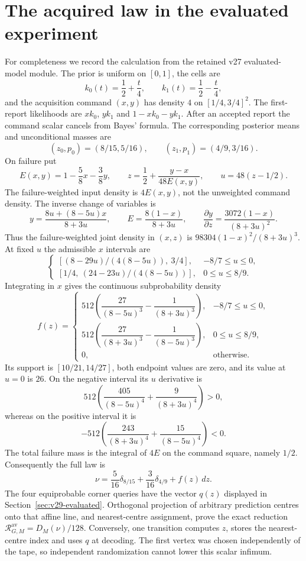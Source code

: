 \documentclass[11pt]{amsart}
\theoremstyle{definition}\newtheorem{definition}[theorem]{Definition}
\theoremstyle{remark}\newtheorem{remark}[theorem]{Remark}
\begin{document}
\section{The acquired law in the evaluated experiment}
\label{app:v29-density}
For completeness we record the calculation from the retained v27 evaluated-model module. The prior is uniform on $[0,1]$, the cells are
\[
 k_0(t)=\frac12+\frac t4,\qquad k_1(t)=\frac12-\frac t4,
\]
and the acquisition command $(x,y)$ has density $4$ on $[1/4,3/4]^2$. The first-report likelihoods are $xk_0$, $yk_1$ and $1-xk_0-yk_1$. After an accepted report the command scalar cancels from Bayes' formula. The corresponding posterior means and unconditional masses are
\[
 (z_0,p_0)=(8/15,5/16),\qquad (z_1,p_1)=(4/9,3/16).
\]
On failure put
\[
 E(x,y)=1-\frac58x-\frac38y,
 \qquad z=\frac12+\frac{y-x}{48E(x,y)},
 \qquad u=48(z-1/2).
\]
The failure-weighted input density is $4E(x,y)$, not the unweighted command density. The inverse change of variables is
\[
 y=\frac{8u+(8-5u)x}{8+3u},\qquad
 E=\frac{8(1-x)}{8+3u},\qquad
 \frac{\partial y}{\partial z}=\frac{3072(1-x)}{(8+3u)^2}.
\]
Thus the failure-weighted joint density in $(x,z)$ is
$98304(1-x)^2/(8+3u)^3$. At fixed $u$ the admissible $x$ intervals are
\[
 \begin{cases}
 [(8-29u)/(4(8-5u)),\ 3/4],&-8/7\le u\le0,\\
 [1/4,\ (24-23u)/(4(8-5u))],&0\le u\le8/9.
 \end{cases}
\]
Integrating in $x$ gives the continuous subprobability density
\begin{equation}\label{eq:v29-density-explicit}
 f(z)=\begin{cases}
 512\left(\dfrac{27}{(8-5u)^3}-\dfrac1{(8+3u)^3}\right),&-8/7\le u\le0,\\[5pt]
 512\left(\dfrac{27}{(8+3u)^3}-\dfrac1{(8-5u)^3}\right),&0\le u\le8/9,\\[4pt]
 0,&\text{otherwise}.
 \end{cases}
\end{equation}
Its support is $[10/21,14/27]$, both endpoint values are zero, and its value at $u=0$ is $26$. On the negative interval its $u$ derivative is
\[
 512\left(\frac{405}{(8-5u)^4}+\frac9{(8+3u)^4}\right)>0,
\]
whereas on the positive interval it is
\[
 -512\left(\frac{243}{(8+3u)^4}+\frac{15}{(8-5u)^4}\right)<0.
\]
The total failure mass is the integral of $4E$ on the command square, namely $1/2$. Consequently the full law is
\[
 \nu=\frac5{16}\delta_{8/15}+\frac3{16}\delta_{4/9}+f(z)\,dz.
\]
The four equiprobable corner queries have the vector $q(z)$ displayed in Section~\ref{sec:v29-evaluated}. Orthogonal projection of arbitrary prediction centres onto that affine line, and nearest-centre assignment, prove the exact reduction $\mathcal R^{\mathrm{av}}_{G,M}=D_M(\nu)/128$. Conversely, one transition computes $z$, stores the nearest-centre index and uses $q$ at decoding. The first vertex was chosen independently of the tape, so independent randomization cannot lower this scalar infimum.
\end{document}
